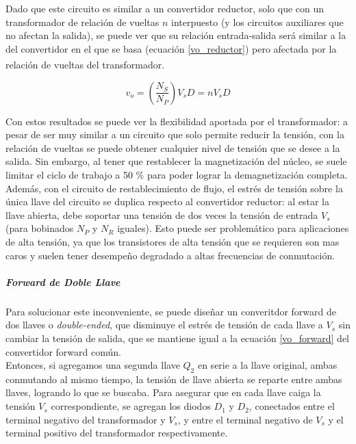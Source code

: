 Dado que este circuito es similar a un convertidor reductor, solo que con un transformador de relación de vueltas $n$ interpuesto (y los circuitos auxiliares que no afectan la salida), se puede ver que su relación entrada-salida será similar a la del convertidor en el que se basa (ecuación \ref{vo_reductor}) pero afectada por la relación de vueltas del transformador.\textsuperscript{\cite{PotenciaHart}}

\begin{equation}\label{vo_forward}
    \boxed{
        v_o = \left(\frac{N_S}{N_P}\right)V_sD = nV_sD
    }
\end{equation}

Con estos resultados se puede ver la flexibilidad aportada por el transformador: a pesar de ser muy similar a un circuito que solo permite reducir la tensión, con la relación de vueltas se puede obtener cualquier nivel de tensión que se desee a la salida. Sin embargo, al tener que restablecer la magnetización del núcleo, se suele limitar el ciclo de trabajo a 50 \% para poder lograr la demagnetización completa.\\

Además, con el circuito de restablecimiento de flujo, el estrés de tensión sobre la única llave del circuito se duplica respecto al convertidor reductor: al estar la llave abierta, debe soportar una tensión de dos veces la tensión de entrada $V_s$ (para bobinados $N_P$ y $N_R$ iguales). Esto puede ser problemático para aplicaciones de alta tensión, ya que los transistores de alta tensión que se requieren son mas caros y suelen tener desempeño degradado a altas frecuencias de conmutación.\\

\subparagraph{Forward de Doble Llave}

Para solucionar este inconveniente, se puede diseñar un converitdor forward de dos llaves o \textit{double-ended}, que disminuye el estrés de tensión de cada llave a $V_s$ sin cambiar la tensión de salida, que se mantiene igual a la ecuación \ref{vo_forward} del convertidor forward común.\\

Entonces, si agregamos una segunda llave $Q_2$ en serie a la llave original, ambas conmutando al mismo tiempo, la tensión de llave abierta se reparte entre ambas llaves, logrando lo que se buscaba. Para asegurar que en cada llave caiga la tensión $V_s$ correspondiente, se agregan los diodos $D_1$ y $D_2$, conectados entre el terminal negativo del transformador y $V_s$, y entre el terminal negativo de $V_s$ y el terminal positivo del transformador respectivamente.\\

